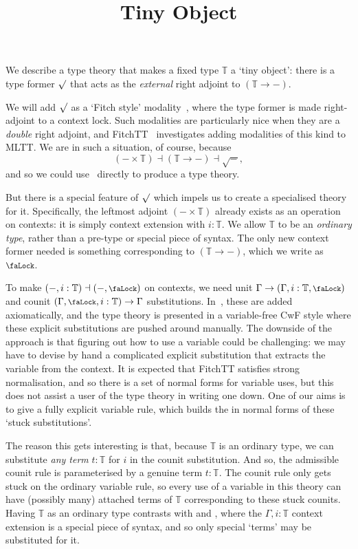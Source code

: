 \documentclass[10pt]{article} \usepackage{fullpage}
\title{Tiny Object}
\author{}
\date{}
\theoremstyle{definition}
\newcommand{\lock}{\mathchoice {\scalebox{0.8}{\text{\faLock}}}
  {\scalebox{0.8}{\text{\faLock}}} {\scalebox{0.5}{\text{\faLock}}}
  {\scalebox{0.4}{\text{\faLock}}} }
\newcommand{\Tiny}{\mathbb{T}}
\newcommand{\rformu}[1]{\surd #1}
\begin{document}
\maketitle

We describe a type theory that makes a fixed type $\Tiny$ a `tiny
object': there is a type former $\rformu$ that acts as the
\emph{external} right adjoint to $(\Tiny \to -)$.

We will add $\rformu$ as a `Fitch style'
modality~\cite{clouston:fitch-style}, where the type former is made
right-adjoint to a context lock. Such modalities are particularly nice
when they are a \emph{double} right adjoint, and
FitchTT~\cite{fitchtt} investigates adding modalities of this kind to
MLTT. We are in such a situation, of course, because
\[{(- \times \Tiny) \dashv (\Tiny \to -) \dashv \rformu -},\] and so
we could use~\cite{fitchtt} directly to produce a type theory.

But there is a special feature of $\rformu$ which impels us to create
a specialised theory for it. Specifically, the leftmost adjoint
$(- \times \Tiny)$ already exists as an operation on contexts: it is
simply context extension with $i : \Tiny$. We allow $\Tiny$ to be an
\emph{ordinary type}, rather than a pre-type or special piece of
syntax. The only new context former needed is something corresponding
to $(\Tiny \to -)$, which we write as $\lock$.

To make $(-,i:\Tiny) \dashv (-,\lock)$ on contexts, we need unit
$\Gamma \to (\Gamma,i : \Tiny, \lock)$ and counit
$(\Gamma,\lock,i : \Tiny) \to \Gamma$
substitutions. In~\cite{fitchtt}, these are added axiomatically, and
the type theory is presented in a variable-free CwF style where these
explicit substitutions are pushed around manually. The downside of the
approach is that figuring out how to use a variable could be
challenging: we may have to devise by hand a complicated explicit
substitution that extracts the variable from the context. It is
expected that FitchTT satisfies strong normalisation, and so there is
a set of normal forms for variable uses, but this does not assist a
user of the type theory in writing one down.  One of our aims is to
give a fully explicit variable rule, which builds the in normal forms
of these `stuck substitutions'.

The reason this gets interesting is that, because $\Tiny$ is an
ordinary type, we can substitute \emph{any term} $t : \Tiny$ for $i$
in the counit substitution. And so, the admissible counit rule is
parameterised by a genuine term $t : \Tiny$. The counit rule only gets
stuck on the ordinary variable rule, so every use of a variable in
this theory can have (possibly many) attached terms of $\Tiny$
corresponding to these stuck counits. Having $\Tiny$ as an ordinary
type contrasts with
\cite{cavallo-harper:parametricity-for-ctt,cavallo:thesis} and
\cite[Section 5]{fitchtt}, where the $\Gamma,i:\Tiny$ context
extension is a special piece of syntax, and so only special `terms'
may be substituted for it.
\end{document}
